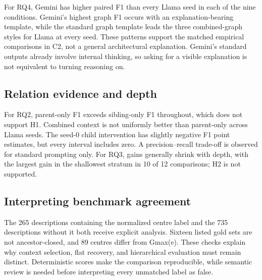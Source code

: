 For RQ4, Gemini has higher paired F1 than every Llama seed in each of the nine conditions. Gemini’s highest graph F1 occurs with an explanation-bearing template, while the standard graph template leads the three combined-graph styles for Llama at every seed. These patterns support the matched empirical comparisons in C2, not a general architectural explanation. Gemini’s standard outputs already involve internal thinking, so asking for a visible explanation is not equivalent to turning reasoning on.


\subsection{Relation evidence and depth}

For RQ2, parent-only F1 exceeds sibling-only F1 throughout, which does not support H1. Combined context is not uniformly better than parent-only across Llama seeds. The seed-0 child intervention has slightly negative F1 point estimates, but every interval includes zero. A precision–recall trade-off is observed for standard prompting only. For RQ3, gains generally shrink with depth, with the largest gain in the shallowest stratum in 10 of 12 comparisons; H2 is not supported.


\subsection{Interpreting benchmark agreement}

The 265 descriptions containing the normalized centre label and the 735 descriptions without it both receive explicit analysis. Sixteen listed gold sets are not ancestor-closed, and 89 centres differ from Gmax(e). These checks explain why context selection, flat recovery, and hierarchical evaluation must remain distinct. Deterministic scores make the comparison reproducible, while semantic review is needed before interpreting every unmatched label as false.

